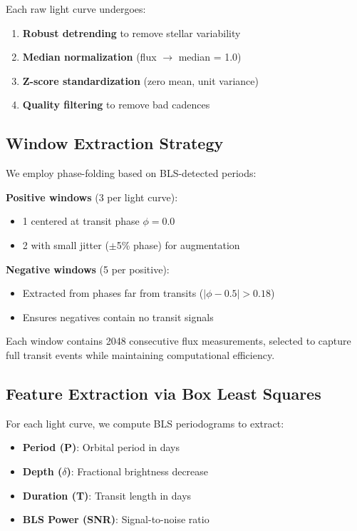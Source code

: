\documentclass[twocolumn]{article}
\begin{document}
Each raw light curve undergoes:
\begin{enumerate}
\item \textbf{Robust detrending} to remove stellar variability
\item \textbf{Median normalization} (flux $\rightarrow$ median = 1.0)
\item \textbf{Z-score standardization} (zero mean, unit variance)
\item \textbf{Quality filtering} to remove bad cadences
\end{enumerate}

\subsection{Window Extraction Strategy}

We employ phase-folding based on BLS-detected periods:

\textbf{Positive windows} (3 per light curve):
\begin{itemize}
\item 1 centered at transit phase $\phi = 0.0$
\item 2 with small jitter ($\pm$5\% phase) for augmentation
\end{itemize}

\textbf{Negative windows} (5 per positive):
\begin{itemize}
\item Extracted from phases far from transits ($|\phi - 0.5| > 0.18$)
\item Ensures negatives contain no transit signals
\end{itemize}

Each window contains 2048 consecutive flux measurements, selected to capture full transit events while maintaining computational efficiency.

\subsection{Feature Extraction via Box Least Squares}

For each light curve, we compute BLS periodograms to extract:
\begin{itemize}
\item \textbf{Period (P)}: Orbital period in days
\item \textbf{Depth ($\delta$)}: Fractional brightness decrease
\item \textbf{Duration (T)}: Transit length in days
\item \textbf{BLS Power (SNR)}: Signal-to-noise ratio
\end{itemize}
\end{document}
